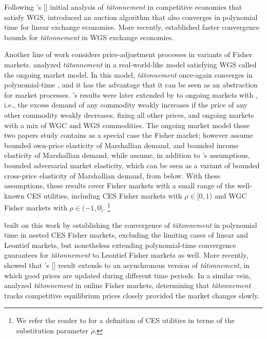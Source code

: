 Following \citeauthor{codenotti2005market}'s [\citeyear{codenotti2005market}] initial analysis of \emph{t\^atonnement\/} in competitive economies that satisfy WGS, \citet{garg2004auction} introduced an auction algorithm that also converges in polynomial time for linear exchange economies.
More recently, \citet{bei2015tatonnement} established faster convergence bounds for \emph{t\^atonnement\/} in WGS exchange economies.

Another line of work considers price-adjustment processes in variants of Fisher markets.
\citet{cole2008fast} analyzed \emph{t\^atonnement\/} in a real-world-like model satisfying WGS called the ongoing market model.
In this model, \emph{t\^atonnement\/} once-again converges in polynomial-time \cite{cole2008fast, cole2010discrete}, and it has the advantage that it can be seen as an abstraction for market processes.
\citeauthor{cole2008fast}'s results were later extended by \citet{cheung2012tatonnement} to ongoing markets with , i.e., the excess demand of any commodity weakly increases if the price of any other commodity weakly decreases, fixing all other prices, and ongoing markets with a mix of WGC and WGS commodities.
The ongoing market model these two papers study contains as a special case the Fisher market; however \citet{cole2008fast} assume bounded own-price elasticity of Marshallian demand, and bounded income elasticity of Marshallian demand, while \citet{cheung2012tatonnement} assume, in addition to \citeauthor{cole2008fast}'s assumptions, bounded adversarial market elasticity, which can be seen as a variant of bounded cross-price elasticity of Marshallian demand, from below.
With these assumptions, these results cover Fisher markets with a small range of the well-known CES utilities, including CES Fisher markets with $\rho \in [0, 1)$ and WGC Fisher markets with $\rho \in (- 1, 0]$.%
\footnote{We refer the reader to  for a definition of CES utilities in terms of the substitution parameter $\rho$.}

\citet{fisher-tatonnement} built on this work by establishing the convergence of \emph{t\^atonnement\/} in polynomial time in nested CES Fisher markets, excluding the limiting cases of linear and Leontief markets, but nonetheless extending polynomial-time convergence guarantees for \emph{t\^atonnement\/} to Leontief Fisher markets as well.
More recently, \citet{cheung2018amortized} showed that \citeauthor{fisher-tatonnement}'s [\citeyear{fisher-tatonnement}] result extends to an asynchronous version of \emph{t\^atonnement}, in which good prices are updated during different time periods. 
In a similar vein, \citet{cheung2019tracing} analyzed \emph{t\^atonnement\/} in online Fisher markets, determining that \emph{t\^atonnement\/} tracks competitive equilibrium prices closely provided the market changes slowly.

